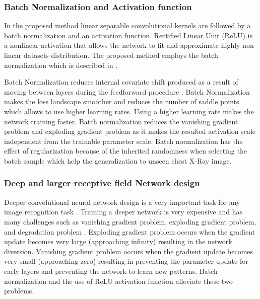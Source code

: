 \subsubsection{ Batch Normalization and  Activation function}

In the proposed method linear separable convolutional kernels are followed by a batch normalization and an activation function. Rectified Linear Unit (ReLU) \cite{he2015delving} is a nonlinear activation that allows the network to fit and approximate highly non-linear datasets distribution. The proposed method employs the batch normalization which is described in \cite{ioffe2015batch}. 

Batch Normalization \cite{ioffe2015batch} reduces internal covariate shift produced as a result of  moving between layers during the feedforward procedure \cite{ioffe2015batch}. Batch Normalization makes the loss landscape smoother and reduces the number of saddle points \cite{santurkar2018does} which allows to use higher learning rates. Using a higher learning rate makes the network training  faster\cite{ioffe2015batch}. Batch normalization reduces the vanishing gradient problem and exploding gradient problem as it makes the resulted activation scale independent from the trainable parameter scale\cite{ioffe2015batch}. Batch normalization has the effect of regularization because of the inherited randomness when selecting the batch sample\cite{ioffe2015batch} which help the generalization to unseen chest X-Ray image.

\subsubsection{ Deep and larger receptive field Network design}

Deeper convolutional neural network design is a very important task for any image recognition task \cite{he2016deep}. Training a deeper network is very expensive and has many challenges such as vanishing gradient problem, exploding gradient problem, and degradation problem \cite{he2016deep}. Exploding gradient problem occurs  when the  gradient update becomes very large (approaching infinity) resulting in the network diversion. Vanishing gradient problem occurs when the  gradient update becomes very small (approaching zero) resulting in preventing the parameter update for early layers\cite{ioffe2015batch} and preventing the network to learn new patterns. Batch normalization \cite{ioffe2015batch} and the use of ReLU activation function \cite{krizhevsky2012imagenet} alleviate these two problems.

